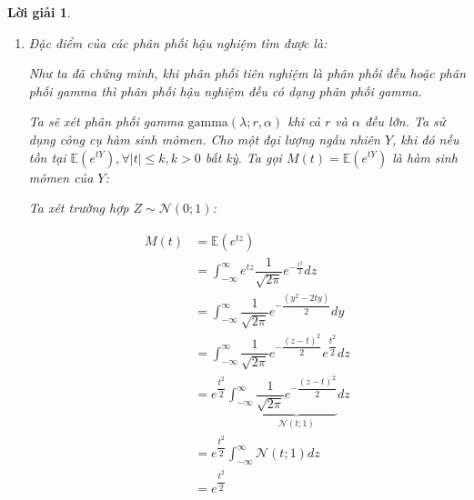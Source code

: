\documentclass[14pt, a4paper]{article}
\theoremstyle{sltheorem}
\theoremstyle{soltheorem}
\newtheorem*{loigiai}{Lời giải}
\begin{document}
\begin{loigiai}
\begin{enumerate}
        Hàm compute\_posterior\_loop thực hiện tính phân phối hậu nghiệm theo bước lặp các quan sát, ậu nghiệm của quan sát trước trở thành tiên nghiệm của quan sát sau

        \begin{python}
posterior_loop_uniform_deg_geq_3 = compute_posterior_loop(prior=prior_uniform, lamdas=lamdas, observes=df_deg_geq_3.CHILDS.to_numpy())
posterior_loop_gamma_deg_geq_3 = compute_posterior_loop(prior=prior_gamma, lamdas=lamdas, observes=df_deg_geq_3.CHILDS.to_numpy())
        \end{python}
        Ta tính giá trị của phân phối hậu nghiệm tại các điểm bằng (cho từng quan sát, hậu nghiệm ở bước trước trở thành tiên nghiệm ở bước sau) vòng lặp trong trường hợp phân phối tiên nghiệm là phân phối đều và phân phối gamma cho nhóm phụ nữ có trình độ văn hóa trên phổ thông (DEG $\geq$ 3)


        \item Đặc điểm của các phân phối hậu nghiệm tìm được là:
        
        Như ta đã chứng minh, khi phân phối tiên nghiệm là phân phối đều hoặc phân phối gamma thì phân phối hậu nghiệm đều có dạng phân phối gamma.

        Ta sẽ xét phân phối gamma $\text{gamma}(\lambda; r, \alpha)$ khi cả $r$ và $\alpha$ đều lớn.
        Ta sử dụng công cụ hàm sinh mômen.
        Cho một đại lượng ngẫu nhiên $Y$, khi đó nếu tồn tại $\mathbb{E}(e^{tY}), \forall \lvert t \rvert \leq k, k > 0$ bất kỳ.
        Ta gọi $M(t) = \mathbb{E}(e^{tY})$ là hàm sinh mômen của $Y$:

        Ta xét trường hợp $Z \sim \mathcal{N}(0; 1)$:

        \begin{equation*}
            \begin{aligned}
                M(t) &= \mathbb{E}(e^{tz}) \\
                &=\int_{-\infty}^{\infty} e^{tz} \dfrac{1}{\sqrt{2\pi}} e^{-\frac{z^2}{2}} dz \\
                &=\int_{-\infty}^{\infty} \dfrac{1}{\sqrt{2\pi}} e^{-\dfrac{(y^2-2ty)}{2}} dy \\
                &=\int_{-\infty}^{\infty} \dfrac{1}{\sqrt{2\pi}} e^{-\dfrac{(z-t)^2}{2}}e^{\dfrac{t^2}{2}} dz \\
                &=e^{\dfrac{t^2}{2}}\int_{-\infty}^{\infty} \underbrace{\dfrac{1}{\sqrt{2\pi}} e^{-\dfrac{(z-t)^2}{2}}}_{\mathcal{N}(t;1)} dz \\
                &=e^{\dfrac{t^2}{2}}\int_{-\infty}^{\infty} \mathcal{N}(t;1) dz \\
                &=e^{\dfrac{t^2}{2}}
            \end{aligned}
        \end{equation*}


\end{enumerate}
\end{loigiai}
\end{document}
